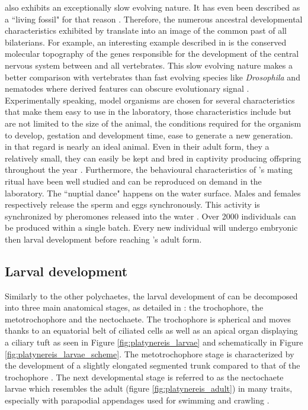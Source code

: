      \platy{} also exhibits an exceptionally slow evolving nature. It has even been described as a ``living fossil" for that reason \cite{Fischer10}. Therefore, the numerous ancestral developmental characteristics exhibited by \platy{} translate into an image of the common past of all bilaterians. For example, an interesting example described in \cite{denes07,tessmar07} is the conserved molecular topography of the genes responsible for the development of the central nervous system between \platy{} and all vertebrates. This slow evolving nature makes \platy{} a better comparison with vertebrates than fast evolving species like \emph{Drosophila} and nematodes where derived features can obscure evolutionary signal \cite{Fischer10,arendt124}.\\
     
     Experimentally speaking, model organisms are chosen for several characteristics that make them easy to use in the laboratory, those characteristics include but are not limited to the size of the animal, the conditions required for the organism to develop, gestation and development time, ease to generate a new generation.\\
     
     in that regard \platy{} is nearly an ideal animal. Even in their adult form, they a relatively small, they can easily be kept and bred in captivity producing offspring throughout the year \cite{fischer04}. Furthermore, the behavioural characteristics of \platy{}'s mating ritual have been well studied and can be reproduced on demand in the laboratory. The ``nuptial dance" happens on the water surface. Males and females respectively release the sperm and eggs synchronously. This activity is synchronized by pheromones released into the water \cite{zeeck98}. Over 2000 individuals can be produced within a single batch. Every new individual will undergo embryonic then larval development before reaching \platy{}'s adult form.\\

 
     \subsection{Larval development}
    Similarly to the other polychaetes, the larval development of \platy{} can be decomposed into three main anatomical stages, as detailed in \cite{hauenschild69}: the trochophore, the metotrochophore and the nectochaete. The trochophore is spherical and moves thanks to an equatorial belt of ciliated cells as well as an apical organ displaying a ciliary tuft \cite{rouse99,nielsen04} as seen in Figure \ref{fig:platynereis_larvae} and schematically in Figure \ref{fig:platynereis_larvae_scheme}. The metotrochophore stage is characterized by the development of a slightly elongated segmented trunk compared to that of the trochophore \cite{hacker98}. The next developmental stage is referred to as the nectochaete larvae which resembles the adult (figure \ref{fig:platynereis_adult}) in many traits, especially with parapodial appendages used for swimming and crawling \cite{hacker98}.\\
    
